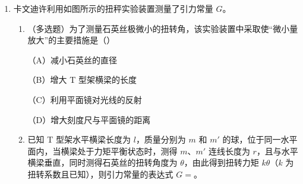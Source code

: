 \documentclass[\gkver]{gaokaozhenti}
\begin{document}
\begin{enumerate}
\begin{enumerate}
	（A）在一块平整木板上依次铺放复写纸、白纸、导电纸

	（B）导电纸有导电物质的一面应该向上

	（C）连接电源正负极的电极 a、b 必须与导电物质保持绝缘

	（D）连接电极 a、b 的电源电压为交流 $4 \sim 6\UV$
\end{enumerate}

\item
卡文迪许利用如图所示的扭秤实验装置测量了引力常量 $G$。
\begin{enumerate}
	\item
	（多选题）为了测量石英丝极微小的扭转角，该实验装置中采取使“微小量放大”的主要措施是（\quad）

	（A）减小石英丝的直径

	（B）增大 T 型架横梁的长度

	（C）利用平面镜对光线的反射

	（D）增大刻度尺与平面镜的距离
	\item
	已知 T 型架水平横梁长度为 $l$，质量分别为 $m$ 和 $m'$ 的球，位于同一水平面内，当横梁处于力矩平衡状态时，测得 $m$、$m'$ 连线长度为 $r$，且与水平横梁垂直，同时测得石英丝的扭转角度为 $\theta$，由此得到扭转力矩 $k\theta$（$k$ 为扭转系数且已知），则引力常量的表达式 $G =$。
\end{enumerate}
\onepicture[align=right, w=6.90cm]{}
\end{enumerate}
\end{document}
